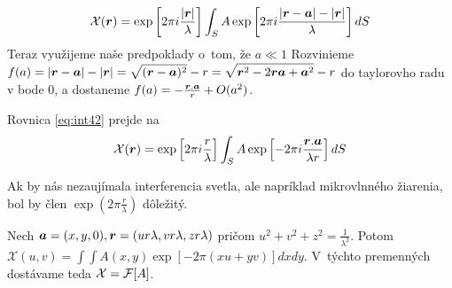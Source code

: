 \begin{equation}
\mathcal{X}(\boldsymbol{r})=
 \exp \left[ 2 \pi i \frac{|\boldsymbol{r}|}{\lambda} \right]
\int_S A
 \exp \left[ 2 \pi i \frac{|\boldsymbol{r}-\boldsymbol{a}|-|\boldsymbol{r}|}{\lambda}
 \right] dS
 \label{eq:int42} 
\end{equation}
Teraz využijeme naše predpoklady o~tom, že $a \ll 1$
Rozvinieme 
$\displaystyle f(a)=|\boldsymbol{r}-\boldsymbol{a}|-|\boldsymbol{r}| =
\sqrt{ (\boldsymbol{r}-\boldsymbol{a})^2 } - r =
\sqrt{ \boldsymbol{r}^2 - 2 \boldsymbol{r}\boldsymbol{a} + \boldsymbol{a}^2 } -r$
do taylorovho radu v bode 0, a dostaneme
$f(a)=-\frac{\boldsymbol{r}.\boldsymbol{a}}{r} +O(a^2)$.

Rovnica \ref{eq:int42} prejde na
\begin{equation}
\mathcal{X}(\boldsymbol{r})=
 \exp \left[ 2 \pi i \frac{r}{\lambda} \right]
\int_S A
 \exp \left[- 2 \pi i \frac{\boldsymbol{r}.\boldsymbol{a}}{\lambda r} \right] dS
\end{equation}

Ak by nás nezaujímala interferencia svetla, ale napríklad mikrovlnného
žiarenia, bol by člen 
$\exp \left(2 \pi \frac{r}{\lambda} \right) $ dôležitý.



Nech $\boldsymbol{a}=(x,y,0), \boldsymbol{r}=(u r \lambda, v r \lambda,z r \lambda)$ pričom
$u^2 + v^2 + z^2=\frac{1}{\lambda^2}$.
Potom $ \displaystyle
\mathcal{X}(u,v)=
\int \int A(x,y)
 \exp \left[- 2 \pi (xu+yv) \right] dx dy$.
V~týchto premenných dostávame teda $\mathcal{X}=\mathcal{F}[A]$.

 \\
 \\
 \\
 \\
